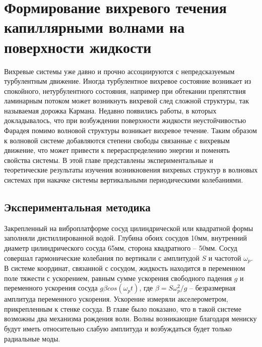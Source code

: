 


\chapter{Формирование вихревого течения капиллярными волнами на поверхности жидкости} \label{chapt3}

Вихревые системы уже давно и прочно ассоциируются с непредсказуемым турбулентным движение. Иногда турбулентное вихревое состояние возникает из спокойного, нетурбулентного состояния, например при обтекании препятствия ламинарным потоком может возникнуть вихревой след сложной структуры, так называемая дорожка Кармана. Недавно появились работы, в которых докладывалось, что при возбуждении поверхности жидкости неустойчивостью Фарадея помимо волновой структуры возникает вихревое течение. Таким образом к волновой системе добавляются степени свободы связанные с вихревым движение, что может привести к перераспределению энергии и поменять свойства системы. В этой главе представлены экспериментальные и теоретические результаты изучения возникновения вихревых структур в волновых системах при накачке системы вертикальными периодическими колебаниями.

\section{Экспериментальная методика}\label{sect3_2}
Закрепленный на виброплатформе сосуд цилиндрической или квадратной формы заполняли дистиллированной водой. Глубина обоих сосудов 10мм, внутренний диаметр цилиндрического сосуда 65мм, сторона квадратного – 50мм. Сосуд совершал гармонические колебания по вертикали с амплитудой $S$ и частотой $\omega_p$. В системе координат, связанной с сосудом, жидкость находится в переменном поле тяжести с ускорением, равным сумме ускорения свободного падения $g$ и переменного ускорения сосуда $g \beta cos(\omega_p t)$, где $\beta = S \omega_p^2/g$ – безразмерная амплитуда переменного ускорения. Ускорение измеряли акселерометром, прикрепленным к стенке сосуда. В главе  было показано, что в такой системе возможны два механизма рождения волн. Волны возникающие благодаря мениску будут иметь относительно слабую амплитуда и возбуждаться будет только радиальные моды.

